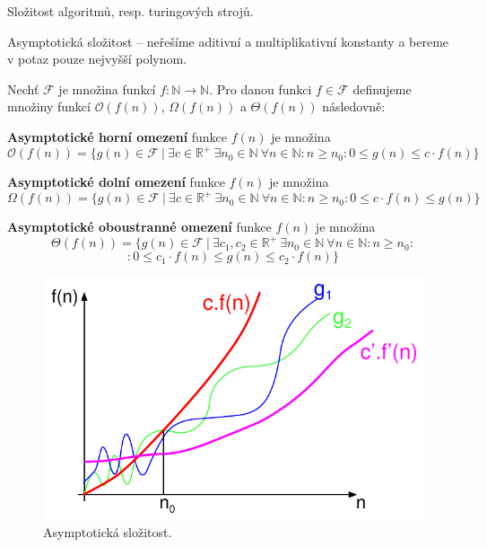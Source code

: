 \begin{compactitem}
    \item Složitost algoritmů, resp. turingových strojů.

    \item Asymptotická složitost -- neřešíme aditivní a multiplikativní konstanty a bereme v potaz pouze nejvyšší polynom.

    \item Nechť $\mathcal{F}$ je množina funkcí $f : \mathbb{N} \rightarrow \mathbb{N}$. Pro danou funkci $f \in \mathcal{F}$ definujeme množiny funkcí $\mathcal{O}(f(n))$, $\Omega(f(n))$ a $\Theta(f(n))$ následovně: \begin{compactitem}

        \item \textbf{Asymptotické horní omezení} funkce $f(n)$ je množina
        $$ \mathcal{O}(f(n)) = \{ g(n) \in \mathcal{F} ~|~ \exists c \in \mathbb{R}^{+} ~\exists n_0 \in \mathbb{N} ~\forall n \in \mathbb{N} : n \geq n_0 : 0 \leq g(n) \leq c \cdot f(n) \} $$

        \item \textbf{Asymptotické dolní omezení} funkce $f(n)$ je množina
        $$ \Omega(f(n)) = \{ g(n) \in \mathcal{F} ~|~ \exists c \in \mathbb{R}^{+} ~\exists n_0 \in \mathbb{N} ~\forall n \in \mathbb{N} : n \geq n_0 : 0 \leq c \cdot f(n) \leq g(n) \} $$

        \item \textbf{Asymptotické oboustranné omezení} funkce $f(n)$ je množina
        $$ \Theta(f(n)) = \{ g(n) \in \mathcal{F} ~|~ \exists c_1, c_2 \in \mathbb{R}^{+} ~\exists n_0 \in \mathbb{N} ~\forall n \in \mathbb{N} : n \geq n_0 : $$
        $$ : 0 \leq c_1 \cdot f(n) \leq g(n) \leq c_2 \cdot f(n) \} $$

    \end{compactitem}
\end{compactitem}

\begin{figure}[H]
    \centering
    \includegraphics[width=0.75\linewidth]{complexity.pdf}
    \caption{Asymptotická složitost.}
\end{figure}

